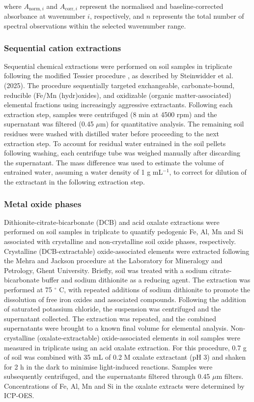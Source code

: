\documentclass[preprint,12pt]{elsarticle}
\begin{document}
where $A_{\mathrm{norm},i}$ and $A_{\mathrm{corr},i}$ represent the normalised and baseline-corrected absorbance at wavenumber $i$, respectively, and $n$ represents the total number of spectral observations within the selected wavenumber range.

\subsubsection{Sequential cation extractions}

Sequential chemical extractions were performed on soil samples in triplicate following the modified Tessier procedure \citep{Tessier1979}, as described by Steinwidder et al. (2025). The procedure sequentially targeted exchangeable, carbonate-bound, reducible (Fe/Mn (hydr)oxides), and oxidizable (organic matter-associated) elemental fractions using increasingly aggressive extractants. Following each extraction step, samples were centrifuged (8 min at 4500 rpm) and the supernatant was filtered (0.45 $\mu$m) for quantitative analysis. The remaining soil residues were washed with distilled water before proceeding to the next extraction step. To account for residual water entrained in the soil pellets following washing, each centrifuge tube was weighed manually after discarding the supernatant. The mass difference was used to estimate the volume of entrained water, assuming a water density of 1 g mL\(^{-1}\), to correct for dilution of the extractant in the following extraction step.

\subsubsection{Metal oxide phases}

Dithionite-citrate-bicarbonate (DCB) and acid oxalate extractions were performed on  soil samples in triplicate to quantify pedogenic Fe, Al, Mn and Si associated with crystalline and non-crystalline soil oxide phases, respectively.
Crystalline (DCB-extractable) oxide-associated elements were extracted following the Mehra and Jackson procedure \citep{Mehra1958}  at the Laboratory for Mineralogy and Petrology, Ghent University. Briefly, soil was treated with a sodium citrate-bicarbonate buffer and sodium dithionite as a reducing agent. The extraction was performed at 75 $^\circ$ C, with repeated additions of sodium dithionite to promote the dissolution of free iron oxides and associated compounds. Following the addition of saturated potassium chloride, the suspension was centrifuged and the supernatant collected. The extraction was repeated, and the combined supernatants were brought to a known final volume for elemental analysis. 
Non-crystalline (oxalate-extractable) oxide-associated elements in soil samples were measured in triplicate using an acid oxalate extraction. For this procedure, 0.7 g of soil was combined with 35 mL of 0.2 M oxalate extractant (pH 3) and shaken for 2 h in the dark to minimise light-induced reactions. Samples were subsequently centrifuged, and the supernatants filtered through 0.45 $\mu$m filters. Concentrations of Fe, Al, Mn and Si in the oxalate extracts were determined by ICP-OES.
\end{document}
